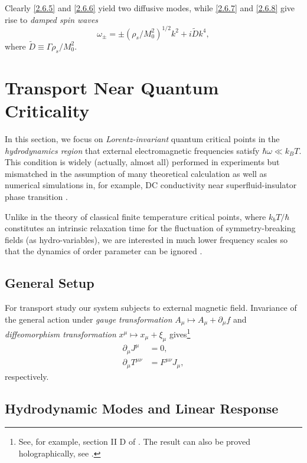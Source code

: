 \documentclass[10pt,nofootinbib]{revtex4}
\begin{document}
		Clearly \eqref{2.6.5} and \eqref{2.6.6} yield two diffusive modes, while \eqref{2.6.7} and \eqref{2.6.8} give rise to \emph{damped spin waves}
		\begin{equation}\label{2.6.9}
			\omega_\pm=\pm(\rho_s/M_0^2)^{1/2}k^2+i \widetilde{D}k^4, 
		\end{equation}
		where $\widetilde{D}\equiv\Gamma\rho_s/M_0^2$.


\section{Transport Near Quantum Criticality}
	In this section, we focus on \emph{Lorentz-invariant} quantum critical points in the \emph{hydrodynamics region} that external electromagnetic frequencies satisfy $\hbar\omega\ll k_B T$. This condition is widely (actually, almost all) performed in experiments but mismatched in the assumption of many theoretical calculation as well as numerical simulations in, for example, DC conductivity near superfluid-insulator phase transition \cite{damle1997nonzero}.\par
	Unlike in the theory of classical finite temperature critical points, where $k_bT/\hbar$ constitutes an intrinsic relaxation time for the fluctuation of symmetry-breaking fields (as hydro-variables), we are interested in much lower frequency scales so that the dynamics of order parameter can be ignored \cite{hartnoll2007theory}.

	\subsection{General Setup}
		For transport study our system subjects to external magnetic field. Invariance of the general action under \emph{gauge transformation} $A_\mu\mapsto A_\mu+\partial_\mu f$ and \emph{diffeomorphism transformation} $x^\mu\mapsto x_\mu+\xi_\mu$ gives\footnote{See, for example, section II D of \cite{herzog2009lectures}. The result can also be proved holographically, see \cite{lindgren2015holographic}.}
		\begin{align}\label{5.1.1}
			\partial_\mu J^\mu&=0,\\
			\partial_\mu T^{\mu\nu}&=F^{\mu\nu}J_\mu,
		\end{align}
		respectively.
		
	\subsection{Hydrodynamic Modes and Linear Response}
\end{document}
